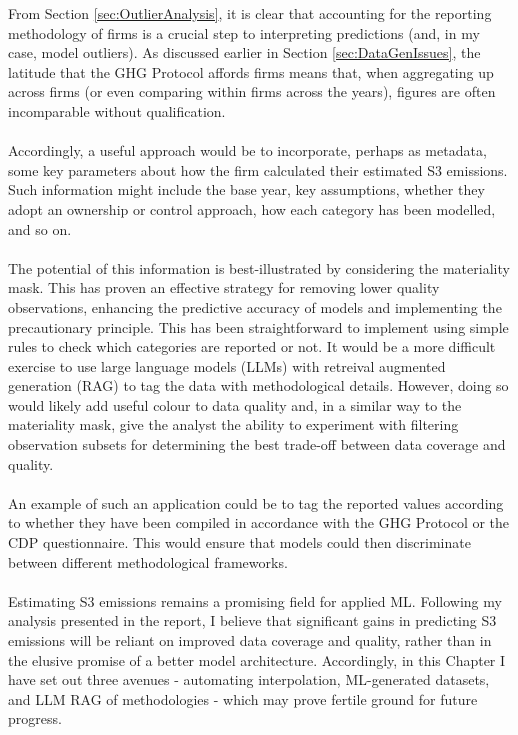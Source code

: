 \documentclass[12pt,twoside]{report}
\begin{document}
From Section \ref{sec:OutlierAnalysis}, it is clear that accounting for the reporting methodology of firms is a crucial step to interpreting predictions (and, in my case, model outliers). As discussed earlier in Section \ref{sec:DataGenIssues}, the latitude that the GHG Protocol affords firms means that, when aggregating up across firms (or even comparing within firms across the years), figures are often incomparable without qualification.
\\\\
Accordingly, a useful approach would be to incorporate, perhaps as metadata, some key parameters about how the firm calculated their estimated S3 emissions. Such information might include the base year, key assumptions, whether they adopt an ownership or control approach, how each category has been modelled, and so on.  
\\\\
The potential of this information is best-illustrated by considering the materiality mask. This has proven an effective strategy for removing lower quality observations, enhancing the predictive accuracy of models and implementing the precautionary principle. This has been straightforward to implement using simple rules to check which categories are reported or not. It would be a more difficult exercise to use large language models (LLMs) with retreival augmented generation (RAG) to tag the data with methodological details. However, doing so would likely add useful colour to data quality and, in a similar way to the materiality mask, give the analyst the ability to experiment with filtering observation subsets for determining the best trade-off between data coverage and quality. 
\\\\
An example of such an application could be to tag the reported values according to whether they have been compiled in accordance with the GHG Protocol or the CDP questionnaire. This would ensure that models could then discriminate between different methodological frameworks.
\\\\
Estimating S3 emissions remains a promising field for applied ML. Following my analysis presented in the report, I believe that significant gains in predicting S3 emissions will be reliant on improved data coverage and quality, rather than in the elusive promise of a better model architecture. Accordingly, in this Chapter I have set out three avenues - automating interpolation, ML-generated datasets, and LLM RAG of methodologies - which may prove fertile ground for future progress. 
\end{document}
